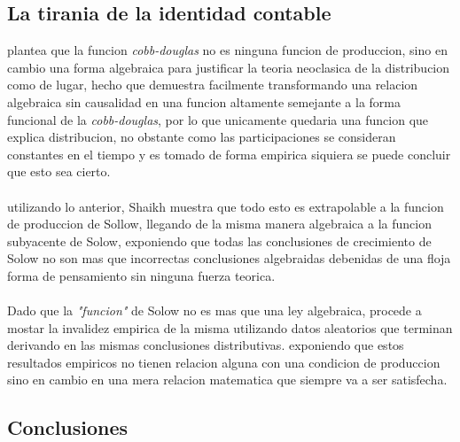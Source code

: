 \documentclass[11pt]{article}
\begin{document}
\begin{flushleft}
    \subsection{La tirania de la identidad contable}
    \citet{shaikh_1974} plantea que la funcion \textit{cobb-douglas} no es ninguna funcion de produccion, 
    sino en cambio una forma algebraica para justificar la teoria neoclasica de la distribucion como de lugar,
    hecho que demuestra facilmente transformando una relacion algebraica sin causalidad en una funcion altamente
    semejante a la forma funcional de la \textit{cobb-douglas}, por lo que unicamente quedaria
    una funcion que explica distribucion, no obstante como las participaciones se consideran
    constantes en el tiempo y es tomado de forma empirica siquiera se puede concluir que esto sea cierto.
    \\~\\
    utilizando lo anterior, Shaikh muestra que todo esto es extrapolable a la funcion de produccion de Sollow,
    llegando de la misma manera algebraica a la funcion subyacente de Solow, exponiendo que todas las conclusiones
    de crecimiento de Solow no son mas que incorrectas conclusiones algebraidas debenidas de una floja forma de pensamiento sin ninguna fuerza teorica.
    \\~\\
    Dado que la \textit{"funcion"} de Solow no es mas que una ley algebraica, procede a mostar la invalidez empirica de la misma utilizando datos aleatorios
    que terminan derivando en las mismas conclusiones distributivas. exponiendo que estos resultados empiricos no tienen relacion alguna con 
    una condicion de produccion sino en cambio en una mera relacion matematica que siempre va a ser satisfecha.
    
    \subsection{Conclusiones}


\end{flushleft}
\end{document}
